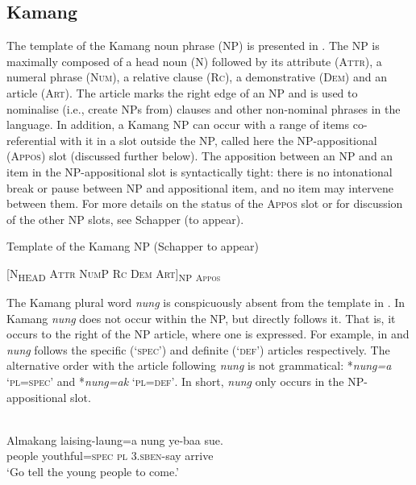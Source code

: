 \subsection{Kamang} %
\label{sec:9:3.3}
The template of the Kamang noun phrase (NP) is presented in . The NP is maximally composed of a head noun (\textsc{N}) followed by its attribute (\textsc{Attr),} a numeral phrase \textsc{(Num)}, a relative clause (\textsc{Rc}), a demonstrative \textsc{(Dem)} and an article \textsc{(Art)}. The article marks the right edge of an NP and is used to nominalise (i.e., create NPs from) clauses and other non-nominal phrases in the language. In addition, a Kamang NP can occur with a range of items co-referential with it in a slot outside the NP, called here the NP-appositional (\textsc{Appos)} slot (discussed further below). The apposition between an NP and an item in the NP-appositional slot is syntactically tight: there is no intonational break or pause between NP and appositional item, and no item may intervene between them. For more details on the status of the \textsc{Appos} slot or for discussion of the other NP slots, see Schapper (to appear).

\ea%
\label{ex:9:31}
Template of the Kamang NP (Schapper to appear)

 [\textsc{N}\textsc{\textsubscript{HEAD}}\textsc{ Attr  NumP  Rc  Dem  Art]}\textsc{\textsubscript{NP}} \textsc{\textsubscript{Appos}}

\z


The Kamang plural word \textit{nung} is conspicuously absent from the template in . In Kamang \textit{nung} does not occur within the NP, but directly follows it. That is, it occurs to the right of the NP article, where one is expressed. For example, in  and  \textit{nung} follows the specific (`\textsc{spec}') and definite (`\textsc{def}') articles respectively. The alternative order with the article following \textit{nung} is not grammatical: *\textit{nung=a} `\textsc{pl=spec}' and *\textit{nung=ak} `\textsc{pl=def'}. In short, \textit{nung} only occurs in the NP-appositional slot.


\ea%
\label{ex:9:32}
 \\
\gll  Almakang laising-laung=a nung {ye}{{\textglotstop}}{-baa} sue. \\
  people youthful=\textsc{spec} \textsc{pl} \textsc{3.sben}-say arrive  \\
\glt `Go tell the young people to come.'
\z







